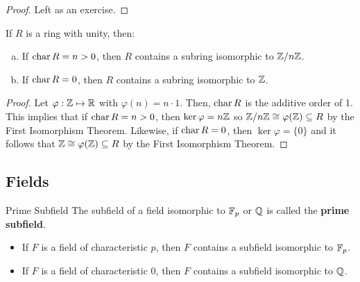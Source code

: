 \documentclass[letterpaper]{article}
\begin{document}
\begin{mdframed}[]
    \begin{proof}
        Left as an exercise.
    \end{proof}
\end{mdframed}


\begin{proposition}
    If $R$ is a ring with unity, then:
    \begin{enumerate}[(a)]
        \item If $\operatorname{char} R = n > 0$, then $R$ contains a subring isomorphic to $\mathbb{Z} / n\mathbb{Z}$.
        \item If $\operatorname{char} R = 0$, then $R$ contains a subring isomorphic to $\mathbb{Z}$.
    \end{enumerate}
\end{proposition}

\begin{mdframed}[]
    \begin{proof}
        Let $\varphi: \mathbb{Z} \mapsto \mathbb{R}$ with $\varphi(n) = n \cdot 1$. Then, $\operatorname{char} R$ is the additive order of 1. This implies that if $\operatorname{char} R = n > 0$, then $\ker \varphi = n\mathbb{Z}$ so $\mathbb{Z} / n\mathbb{Z} \cong \varphi(\mathbb{Z}) \subseteq R$ by the First Isomorphism Theorem. Likewise, if $\operatorname{char} R = 0$, then $\ker \varphi = \{0\}$ and it follows that $\mathbb{Z} \cong \varphi(\mathbb{Z}) \subseteq R$ by the First Isomorphism Theorem. 
    \end{proof}
\end{mdframed}

\subsection{Fields}

\begin{definition}{Prime Subfield}{}
    The subfield of a field isomorphic to $\mathbb{F}_p$ or $\mathbb{Q}$ is called the \textbf{prime subfield}.
\end{definition}

\begin{theorem}{}{}
    \begin{itemize}
        \item If $F$ is a field of characteristic $p$, then $F$ contains a subfield isomorphic to $\mathbb{F}_p$.
        \item If $F$ is a field of characteristic 0, then $F$ contains a subfield isomorphic to $\mathbb{Q}$. 
    \end{itemize} 
\end{theorem}
\end{document}

